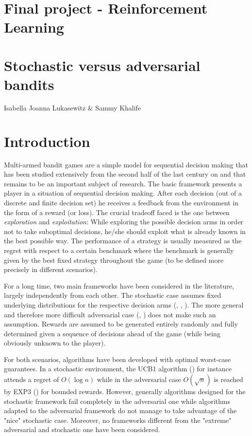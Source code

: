 \documentclass[11pt]{article}
\begin{document}
\parskip 6pt

\begin{center}
\section*{Final project - Reinforcement Learning}
\section*{Stochastic versus adversarial bandits}
\large{Isabella Joanna Lukasewitz \& Sammy Khalife}
\end{center}

\section*{Introduction}
Multi-armed bandit games are a simple model for sequential decision making that has been studied extensively from the second half of the last century on and that remains to be an important subject of research. The basic framework presents a player in a situation of sequential decision making. After each decision (out of a discrete and finite decision set) he receives a feedback from the environment in the form of a reward (or loss). The crucial tradeoff faced is the one between \textit{exploration} and \textit{exploitation}: While exploring the possible decision arms in order not to take suboptimal decisions, he/she should exploit what is already known in the best possible way. The performance of a strategy is usually measured as the regret with respect to a certain benchmark where the benchmark is generally given by the best fixed strategy throughout the game (to be defined more precisely in different scenarios).

For a long time, two main frameworks have been considered in the literature, largely independently from each other. The stochastic case assumes fixed underlying distributions for the respective decision arms (\cite{Thom33}, \cite{Robb85}, \cite{Auer02a}). The more general and therefore more difficult adversarial case (\cite{Auer95},  \cite{Auer02b}) does not make such an assumption. Rewards are assumed to be generated entirely randomly and fully determined given a sequence of decisions ahead of the game (while being obviously unknown to the player).

For both scenarios, algorithms have been developed with optimal worst-case guarantees. In a stochastic environment, the UCB1 algorithm (\cite{Auer02a}) for instance attends a regret of $O(\log n)$ while in the adversarial case $O(\sqrt{n})$ is reached by EXP3 (\cite{Auer02b}) for bounded rewards. However, generally algorithms designed for the stochastic framework fail completely in the adversarial one while algorithms adapted to the adversarial framework do not manage to take advantage of the "nice" stochastic case. Moreover, no frameworks different from the "extreme" adversarial and stochastic one have been considered.
\end{document}
